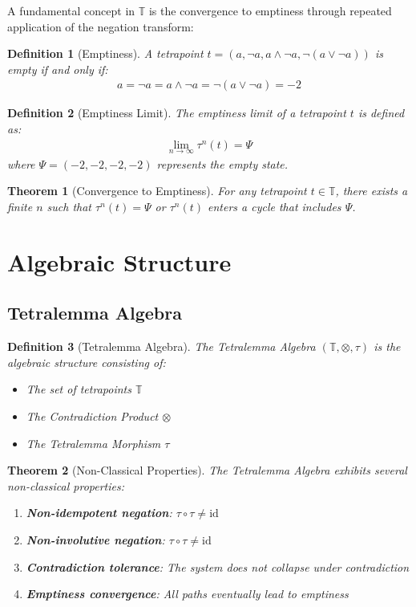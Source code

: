 \documentclass[11pt,a4paper]{article}
\newtheorem{definition}{Definition}
\newtheorem{theorem}{Theorem}
\begin{document}
A fundamental concept in $\mathbb{T}$ is the convergence to emptiness through repeated application of the negation transform:

\begin{definition}[Emptiness]
A tetrapoint $t = (a, \neg a, a \wedge \neg a, \neg(a \vee \neg a))$ is empty if and only if:
\begin{align}
a = \neg a = a \wedge \neg a = \neg(a \vee \neg a) = -2
\end{align}
\end{definition}

\begin{definition}[Emptiness Limit]
The emptiness limit of a tetrapoint $t$ is defined as:
\begin{align}
\lim_{n \to \infty} \tau^n(t) = \Psi
\end{align}
where $\Psi = (-2, -2, -2, -2)$ represents the empty state.
\end{definition}

\begin{theorem}[Convergence to Emptiness]
For any tetrapoint $t \in \mathbb{T}$, there exists a finite $n$ such that $\tau^n(t) = \Psi$ or $\tau^n(t)$ enters a cycle that includes $\Psi$.
\end{theorem}

\section{Algebraic Structure}

\subsection{Tetralemma Algebra}

\begin{definition}[Tetralemma Algebra]
The Tetralemma Algebra $(\mathbb{T}, \otimes, \tau)$ is the algebraic structure consisting of:
\begin{itemize}
    \item The set of tetrapoints $\mathbb{T}$
    \item The Contradiction Product $\otimes$
    \item The Tetralemma Morphism $\tau$
\end{itemize}
\end{definition}

\begin{theorem}[Non-Classical Properties]
The Tetralemma Algebra exhibits several non-classical properties:
\begin{enumerate}
    \item \textbf{Non-idempotent negation}: $\tau \circ \tau \neq \text{id}$
    \item \textbf{Non-involutive negation}: $\tau \circ \tau \neq \text{id}$
    \item \textbf{Contradiction tolerance}: The system does not collapse under contradiction
    \item \textbf{Emptiness convergence}: All paths eventually lead to emptiness
\end{enumerate}
\end{theorem}
\end{document}
